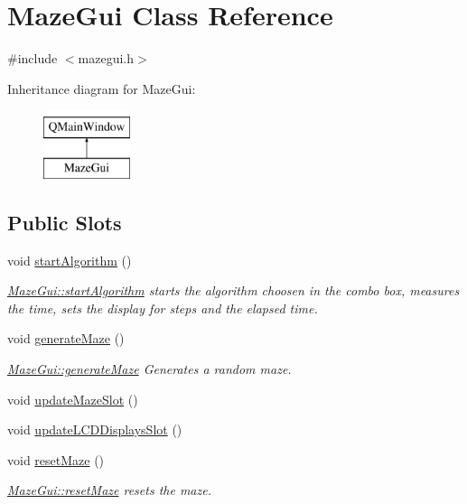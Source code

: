 \hypertarget{class_maze_gui}{\section{Maze\-Gui Class Reference}
\label{class_maze_gui}
}


{\ttfamily \#include $<$mazegui.\-h$>$}

Inheritance diagram for Maze\-Gui\-:\begin{figure}[H]
\begin{center}
\leavevmode
\includegraphics[height=2.000000cm]{class_maze_gui}
\end{center}
\end{figure}
\subsection*{Public Slots}
\begin{DoxyCompactItemize}
\item 
void \hyperlink{class_maze_gui_aa3b128bc77c97364bd0abcfab50facac}{start\-Algorithm} ()
\begin{DoxyCompactList}\small\item\em \hyperlink{class_maze_gui_aa3b128bc77c97364bd0abcfab50facac}{Maze\-Gui\-::start\-Algorithm} starts the algorithm choosen in the combo box, measures the time, sets the display for steps and the elapsed time. \end{DoxyCompactList}\item 
void \hyperlink{class_maze_gui_a951cf062b683fc7b9e35f5e655b0f609}{generate\-Maze} ()
\begin{DoxyCompactList}\small\item\em \hyperlink{class_maze_gui_a951cf062b683fc7b9e35f5e655b0f609}{Maze\-Gui\-::generate\-Maze} Generates a random maze. \end{DoxyCompactList}\item 
void \hyperlink{class_maze_gui_ad16d7a5be838ffbde722bfdeb05859a4}{update\-Maze\-Slot} ()
\item 
void \hyperlink{class_maze_gui_a11530ab74ba41b8013ecacc25aca3363}{update\-L\-C\-D\-Displays\-Slot} ()
\item 
void \hyperlink{class_maze_gui_a476e096a825384dc09d625e047a6c61b}{reset\-Maze} ()
\begin{DoxyCompactList}\small\item\em \hyperlink{class_maze_gui_a476e096a825384dc09d625e047a6c61b}{Maze\-Gui\-::reset\-Maze} resets the maze. \end{DoxyCompactList}\end{DoxyCompactItemize}
